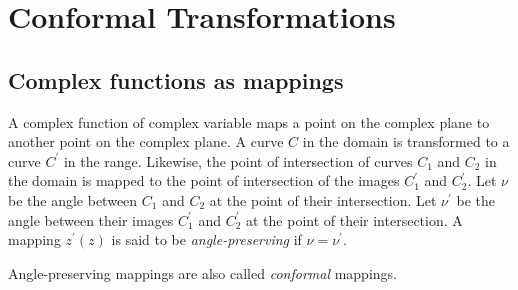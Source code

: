 \chapter{Conformal Transformations}\label{c3}
\section{Complex functions as mappings}\label{c3s1}
A complex function of complex variable maps a point on the complex plane to 
another point on the complex plane. A curve $C$ in the domain is transformed
to a curve $C^\prime$ in the range. Likewise, the point of intersection of
curves $C_1$ and $C_2$ in the domain is mapped to the point of intersection of
the images $C_1^\prime$ and $C_2^\prime$. Let $\nu$ be the angle between $C_1$
and $C_2$ at the point of their intersection. Let $\nu^\prime$ be the angle
between their images $C_1^\prime$ and $C_2^\prime$ at the point of their 
intersection. A mapping $z^\prime(z)$ is said to be \emph{angle-preserving} if
$\nu = \nu^\prime$.

Angle-preserving mappings are also called \emph{conformal} mappings.

